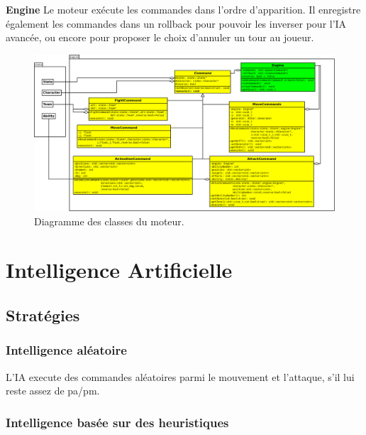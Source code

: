 \documentclass[a4paper,12pt]{article}
\begin{document}
\textbf{Engine} Le moteur exécute les commandes dans l'ordre d'apparition. Il enregistre également les commandes dans un rollback pour pouvoir les inverser pour l'IA avancée, ou encore pour proposer le choix d'annuler un tour au joueur.


\begin{landscape}
    \begin{figure}[p]
        \centering
        \includegraphics[width=0.9\paperheight,keepaspectratio]{engine.png}
        \caption{\label{uml:engine}Diagramme des classes du moteur.}
    \end{figure}
\end{landscape}

\clearpage
\section{Intelligence Artificielle}

\subsection{Stratégies}
\subsubsection{Intelligence aléatoire}

L'IA execute des commandes aléatoires parmi le mouvement et l'attaque, s'il lui reste assez de pa/pm.

\subsubsection{Intelligence basée sur des heuristiques}
\end{document}
